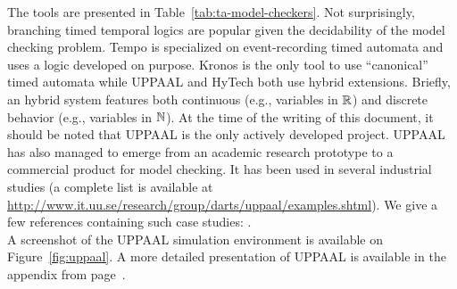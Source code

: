 The tools are presented in Table~\ref{tab:ta-model-checkers}. Not surprisingly, branching timed temporal logics are popular given the decidability of the model checking problem. Tempo is specialized on event-recording timed automata and uses a logic developed on purpose. Kronos is the only tool to use ``canonical'' timed automata while UPPAAL and HyTech both use hybrid extensions. Briefly, an hybrid system \cite{alur97symbolic} features both continuous (e.g., variables in $\mathbb{R}$) and discrete behavior (e.g., variables in $\mathbb{N}$). At the time of the writing of this document, it should be noted that UPPAAL is the only actively developed project. UPPAAL has also managed to emerge from an academic research prototype to a commercial product for model checking. It has been used in several industrial studies (a complete list is available at \url{http://www.it.uu.se/research/group/darts/uppaal/examples.shtml}). We give a few references containing such case studies: \cite{HSLL97, HLS99, DAKRT97, LAAB98, dw00, lpw:tacas98, bowman98automatic, BGKLLPY96, lp:prfts97}.\\

A screenshot of the UPPAAL simulation environment is available on Figure~\ref{fig:uppaal}. A more detailed presentation of UPPAAL is available in the appendix from page~\pageref{chap:uppaal}.

